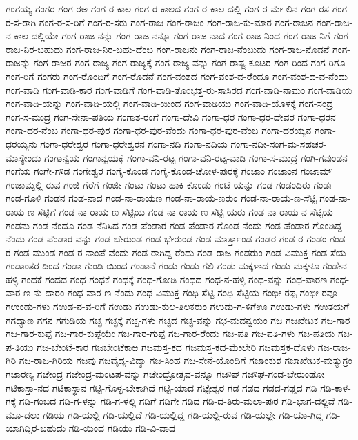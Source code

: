 ಗಂಗಯ್ಯ
ಗಂಗರ
ಗಂಗ-ರಅ
ಗಂಗ-ರ-ಕಾಲ
ಗಂಗ-ರ-ಕಾಲದ
ಗಂಗ-ರ-ಕಾಲ-ದಲ್ಲಿ
ಗಂಗ-ರ-ಮೇ-ಲಿನ
ಗಂಗ-ರಸ
ಗಂಗ-ರ-ಸ-ರಾಗಿ
ಗಂಗ-ರ-ಸ-ರಿಗೆ
ಗಂಗ-ರ-ಸರು
ಗಂಗ-ರಾಜ
ಗಂಗ-ರಾಜಂ
ಗಂಗ-ರಾಜ-ಕು-ಮಾರ
ಗಂಗ-ರಾಜನ
ಗಂಗ-ರಾಜ-ನ-ಕಾಲ-ದಲ್ಲಿಯೇ
ಗಂಗ-ರಾಜ-ನನ್ನು
ಗಂಗ-ರಾಜ-ನನ್ನೂ
ಗಂಗ-ರಾಜ-ನಾದ
ಗಂಗ-ರಾಜ-ನಿಂದ
ಗಂಗ-ರಾಜ-ನಿಗೆ
ಗಂಗ-ರಾಜ-ನಿರ-ಬಹುದು
ಗಂಗ-ರಾಜ-ನಿರ-ಬಹು-ದೆಂಬ
ಗಂಗ-ರಾಜನು
ಗಂಗ-ರಾಜ-ನೆಂಬುದು
ಗಂಗ-ರಾಜ-ನೊಡನೆ
ಗಂಗ-ರಾಜನ್ನು
ಗಂಗ-ರಾಜರ
ಗಂಗ-ರಾಜ್ಯ
ಗಂಗ-ರಾಜ್ಯಕ್ಕೆ
ಗಂಗ-ರಾಜ್ಯ-ವನ್ನು
ಗಂಗ-ರಾಷ್ಟ್ರ-ಕೂಟರ
ಗಂಗ-ರಿಂದ
ಗಂಗ-ರಿಗೂ
ಗಂಗ-ರಿಗೆ
ಗಂಗರು
ಗಂಗ-ರೊಂದಿಗೆ
ಗಂಗ-ರೊಡನೆ
ಗಂಗ-ವಂಶದ
ಗಂಗ-ವಂಶ-ದ-ರೆೆಂದೂ
ಗಂಗ-ವಂಶ-ದ-ವ-ನೆಂದು
ಗಂಗ-ವಾಡಿ
ಗಂಗ-ವಾಡಿ-ಕಾರ
ಗಂಗ-ವಾಡಿಗೆ
ಗಂಗ-ವಾಡಿ-ತೊಂಭತ್ತ-ರು-ಸಾಸಿರದ
ಗಂಗ-ವಾಡಿ-ನಾಮಂ
ಗಂಗ-ವಾಡಿಯ
ಗಂಗ-ವಾಡಿ-ಯನ್ನು
ಗಂಗ-ವಾಡಿ-ಯಲ್ಲಿ
ಗಂಗ-ವಾಡಿ-ಯಿಂದ
ಗಂಗ-ವಾಡಿಯು
ಗಂಗ-ವಾಡಿ-ಯೊಳಕ್ಕೆ
ಗಂಗ-ಸಂದ್ರ
ಗಂಗ-ಸ-ಮುದ್ರ
ಗಂಗ-ಸೇನಾ-ಪತಿಯ
ಗಂಗಾತ-ರಂಗೆ
ಗಂಗಾ-ದೇವಿ
ಗಂಗಾ-ಧರ
ಗಂಗಾ-ಧರ-ದೇವರ
ಗಂಗಾ-ಧರನ
ಗಂಗಾ-ಧರ-ನೆಂಬ
ಗಂಗಾ-ಧರ-ಪುರ
ಗಂಗಾ-ಧರ-ಪುರ-ವೆಂದು
ಗಂಗಾ-ಧರ-ಪುರ-ವೆಂಬ
ಗಂಗಾ-ಧರಯ್ಯನ
ಗಂಗಾ-ಧರಯ್ಯನು
ಗಂಗಾ-ಧರೇಶ್ವರ
ಗಂಗಾ-ಧರೇಶ್ವರನ
ಗಂಗಾ-ನದಿ
ಗಂಗಾ-ನದಿಯ
ಗಂಗಾ-ನದೀ-ಸಂಗ-ಮ-ಸಹಚರ-ಮಾಸ್ಯೇಂದು
ಗಂಗಾನ್ವಯ
ಗಂಗಾನ್ವಯಕ್ಕೆ
ಗಂಗಾ-ವನಿ-ರಟ್ಟ
ಗಂಗಾ-ವನಿ-ರಟ್ಟ-ವಾಡಿ
ಗಂಗಾ-ಸ-ಮುದ್ರ
ಗಂಗಿ-ಗವುಂಡನ
ಗಂಗೆಯ
ಗಂಗೇ-ಗೌಡ
ಗಂಗೇಶ್ವರ
ಗಂಗೈ-ಕೊಂಡ
ಗಂಗೈ-ಕೊಂಡ-ಚೋಳ-ಪುರಕ್ಕೆ
ಗಂಜಾಂ
ಗಂಜಾಂನ
ಗಂಜಾಮ್
ಗಂಜಾಮ್ನಲ್ಲಿ-ರುವ
ಗಂಜಿ-ಗೆರೆಗೆ
ಗಂಜೀ
ಗಂಟು
ಗಂಟು-ಹಾಕಿ-ಕೊಂಡು
ಗಂಟೆ-ಯನ್ನು
ಗಂಡ
ಗಂಡಂದಿರು
ಗಂಡಃ
ಗಂಡ-ಗೂಳಿ
ಗಂಡನ
ಗಂಡ-ನಾದ
ಗಂಡ-ನಾ-ರಾಯಣ
ಗಂಡ-ನಾ-ರಾಯ-ಣರುಂ
ಗಂಡ-ನಾ-ರಾಯ-ಣ-ಸೆಟ್ಟಿ
ಗಂಡ-ನಾ-ರಾಯ-ಣ-ಸೆಟ್ಟಿಗೆ
ಗಂಡ-ನಾ-ರಾಯ-ಣ-ಸೆಟ್ಟಿಯ
ಗಂಡ-ನಾ-ರಾಯ-ಣ-ಸೆಟ್ಟಿ-ಯರು
ಗಂಡ-ನಾ-ರಾಯ-ನ-ಸೆಟ್ಟಿಯ
ಗಂಡನು
ಗಂಡ-ನೆಂದೂ
ಗಂಡ-ನೆನಿಸಿದ
ಗಂಡ-ಪೆಂಡಾರ
ಗಂಡ-ಪೆಂಡಾರ-ಗೊಂಡ-ನೆಂದು
ಗಂಡ-ಪೆಂಡಾರ-ಗೊಂಡಿದ್ದ-ನೆಂದು
ಗಂಡ-ಪೆಂಡಾರ-ವನ್ನು
ಗಂಡ-ಬೇರುಂಡ
ಗಂಡ-ಭೇರುಂಡ
ಗಂಡ-ಮಾರ್ತ್ತಾಂಡ
ಗಂಡರ
ಗಂಡ-ರ-ಗಂಡಂ
ಗಂಡ-ರ-ಗಂಡ-ಮುಂಡ
ಗಂಡ-ರ-ನಾಂಪೆ-ವೆಂದು
ಗಂಡ-ರಾಗಿದ್ದ-ರೆಂದು
ಗಂಡ-ರಾಜ
ಗಂಡರುಂ
ಗಂಡ-ವಿಮುಕ್ತ
ಗಂಡ-ಸೆಯ
ಗಂಡಾಂತರ-ದಿಂದ
ಗಂಡಾ-ಗುಂಡಿ-ಯಿಂದ
ಗಂಡಾನೆ
ಗಂಡು
ಗಂಡು-ಗಲಿ
ಗಂಡು-ಮಕ್ಕಳಾದ
ಗಂಡು-ಮಕ್ಕಳೂ
ಗಂಡೇನ-ಹಳ್ಳಿ
ಗಂದಕೆ
ಗಂದದ
ಗಂಧ
ಗಂಧಕೆ
ಗಂಧಕ್ಕೆ
ಗಂಧ-ಗೋಡಿ
ಗಂಧದ
ಗಂಧ-ನ-ಹಳ್ಳಿ
ಗಂಧ-ವನ್ನು
ಗಂಧ-ವಾರಣ
ಗಂಧ-ವಾರ-ಣ-ನು-ದಾರಂ
ಗಂಧ-ವಾರ-ಣ-ನೆಂದು
ಗಂಧ-ವಿಮುಕ್ತ
ಗಂಧಿ-ಸೆಟ್ಟಿ
ಗಂಧಿ-ಸೆಟ್ಟಿಯ
ಗಂಭೀ-ರಪ್ಪ
ಗಂಭೀ-ರವೂ
ಗಉಂಡು-ಗಳು
ಗಉಡ-ನ-ವ-ರಿಗೆ
ಗಉಡು
ಗಉಡು-ಕುಲ-ತಿಲಕರುಂ
ಗಉಡು-ಗ-ಳಿಗೆಊ
ಗಉಡು-ಗಳು
ಗಉತಯಗೆ
ಗಗದ್ಯಾಣ
ಗಗನ
ಗಗುಡಿಯ
ಗಚ್ಛ
ಗಚ್ಛಕ್ಕೆ
ಗಚ್ಛ-ಗಳು
ಗಚ್ಛದ
ಗಚ್ಛ-ವನ್ನು
ಗಛ-ಮದನ್ವಯಂ
ಗಜ
ಗಜಖೇಟಕ
ಗಜ-ಗಾರ
ಗಜ-ಗಾರ-ಕುಪ್ಪೆ
ಗಜ-ಗಾರ-ಕುಪ್ಪೆಯೇ
ಗಜ-ಗಾರ-ಗುಪ್ಪೆ
ಗಜ-ಗಾರ-ರೆಂದು
ಗಜ-ಪತಿ
ಗಜ-ಪತಿ-ಗಳು
ಗಜ-ಪತಿಯ
ಗಜ-ಪ-ತಿಯು
ಗಜ-ಬೇಂಟೆ-ಕಾರ
ಗಜಬೇಂಟೆಕಾಱ
ಗಜಮಸ್ತ-ಕದ
ಗಜಮಸ್ತ-ಕದ-ಮೇಲೇರಿ
ಗಜಮಸ್ತಕ-ದೊಳು
ಗಜ-ರಾಜ-ಗಿರಿ
ಗಜ-ರಾಜ-ಗಿರಿಯ
ಗಜವು
ಗಜವೈದ್ಯ-ವಿದ್ಯಾ
ಗಜ-ಸಿಂಹ
ಗಜ-ಸೇನೆ-ಯೊಂದಿಗೆ
ಗಜಾಂಕುಶ
ಗಜಾಖೇಟಕ-ಮತ್ಯುಗ್ರಂ
ಗಜಾರಣ್ಯ
ಗಜೇಂದ್ರ
ಗಜೇಂದ್ರ-ಮಂಟಪ-ವನ್ನು
ಗಜೇಂದ್ರೋತ್ಸವ-ವನ್ನೂ
ಗಜೌಘ
ಗಜೌಘ-ಗಂಡ-ಭೇರುಂಡೋ
ಗಟಿಕಾಸ್ತಾ-ನದ
ಗಟಿಕಾಸ್ಥಾನ
ಗಟ್ಟಿ-ಗೊಳ್ಳ-ಬೇಕಾಗಿದೆ
ಗಟ್ಟಿ-ಯಾದ
ಗಟ್ಟೇಶ್ವರ
ಗಡ
ಗಡದ
ಗಡದ-ಗಡ್ಡದ
ಗಡಿ
ಗಡಿ-ಕಾಳ-ಗಕ್ಕೆ
ಗಡಿ-ಗಂಬದ
ಗಡಿ-ಗ-ಳನ್ನು
ಗಡಿ-ಗ-ಳಲ್ಲಿ
ಗಡಿಗೆ
ಗಡಿಗೇ
ಗಡಿದ
ಗಡಿ-ದ-ತಿರು-ಮಲಾ-ಪುರ
ಗಡಿ-ಭಾಗ-ದಲ್ಲಿವೆ
ಗಡಿ-ಮೂ-ಡಲು
ಗಡಿಯ
ಗಡಿ-ಯಲ್ಲಿ
ಗಡಿ-ಯಲ್ಲಿದೆ
ಗಡಿ-ಯಲ್ಲಿದ್ದ
ಗಡಿ-ಯಲ್ಲಿ-ರುವ
ಗಡಿ-ಯಲ್ಲೇ
ಗಡಿ-ಯಾ-ಗಿದ್ದ
ಗಡಿ-ಯಾಗಿದ್ದಿರ-ಬಹುದು
ಗಡಿ-ಯಿಂದ
ಗಡಿಯು
ಗಡಿ-ವಿ-ವಾದ
